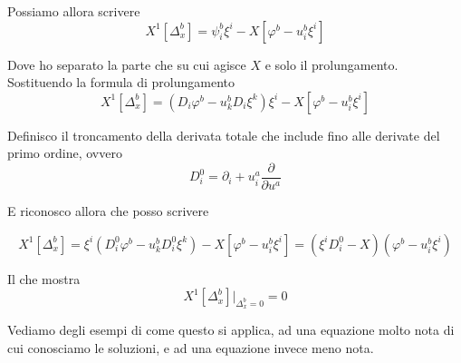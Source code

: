 \documentclass{report}
\begin{document}
Possiamo allora scrivere 
\begin{equation}
    X^1[\Delta_x^b] = \psi^b_i\xi^i - X[\varphi^b - u^b_i\xi^i]
\end{equation}

Dove ho separato la parte che su cui agisce $X$ e solo il prolungamento. Sostituendo la formula di prolungamento 
\begin{equation}
    X^1[\Delta_x^b] = (D_i\varphi^b - u^b_k D_i\xi^k)\xi^i - X[\varphi^b - u^b_i\xi^i]
\end{equation}

Definisco il troncamento della derivata totale che include fino alle derivate del primo ordine, ovvero 
\begin{equation}
    D^0_i = \partial_i + u^a_i \frac{\partial}{\partial u^a}
\end{equation}

E riconosco allora che posso scrivere 

\begin{equation}
    X^1[\Delta_x^b] = \xi^i(D_i^0\varphi^b - u^b_k D_i^0\xi^k) - X[\varphi^b - u^b_i\xi^i] = (\xi^iD_i^0 - X)(\varphi^b - u^b_i\xi^i)
\end{equation}

Il che mostra
\begin{equation}
    X^1[\Delta_x^b]|_{\Delta^b_x = 0} =0 
\end{equation}

Vediamo degli esempi di come questo si applica, ad una equazione molto nota di cui conosciamo le soluzioni, e ad una equazione invece meno nota.
\end{document}
